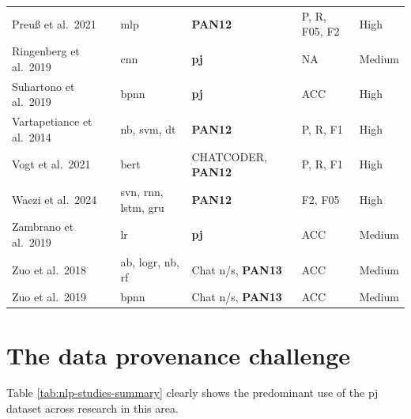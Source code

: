 \documentclass[12pt,a4paper,oneside]{report}
\begin{document}
\begin{table}[ht]
\begin{tabular}{p{3.5cm} p{4.2cm} p{3.0cm} p{2.2cm} p{1.2cm}}
Preu\ss{} et al.\ 2021      & \acrshort{mlp}                                                                                    & \textbf{PAN12}                     & P, R, F05, F2              & High   \\
Ringenberg et al.\ 2019     & \acrshort{cnn}                                                                                    & \textbf{\acrshort{pj}}             & NA                         & Medium \\
Suhartono et al.\ 2019      & \acrshort{bpnn}                                                                                   & \textbf{\acrshort{pj}}             & ACC                        & High   \\
Vartapetiance et al.\ 2014  & \acrshort{nb}, \acrshort{svm}, \acrshort{dt}                                                      & \textbf{PAN12}                     & P, R, F1                   & High   \\
Vogt et al.\ 2021           & \acrshort{bert}                                                                                   & CHATCODER, \textbf{PAN12}          & P, R, F1                   & High   \\
Waezi et al.\ 2024          & \acrshort{svn}, \acrshort{rnn}, \acrshort{lstm}, \acrshort{gru}                                   & \textbf{PAN12}                     & F2, F05                    & High   \\
Zambrano et al.\ 2019       & \acrshort{lr}                                                                                     & \textbf{\acrshort{pj}}             & ACC                        & Medium \\
Zuo et al.\ 2018            & \acrshort{ab}, \acrshort{logr}, \acrshort{nb}, \acrshort{rf}                                      & Chat n/s, \textbf{PAN13}           & ACC                        & Medium \\
Zuo et al.\ 2019            & \acrshort{bpnn}                                                                                   & Chat n/s, \textbf{PAN13}           & ACC                        & Medium \\
\bottomrule
\end{tabular}
\end{table}

\section{The data provenance challenge}
\label{sec:the-data-provenance-challenge}
Table \ref{tab:nlp-studies-summary} clearly shows the predominant use of the \gls{pj} dataset across research in this area.
\end{document}
